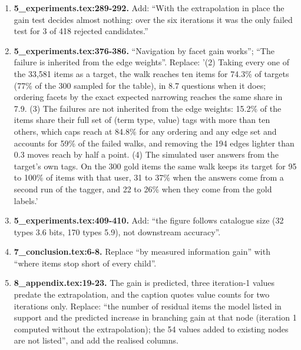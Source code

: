 \documentclass[10pt,a4paper]{article}
\begin{document}
{\begin{enumerate}[leftmargin=1.8em,itemsep=0.45em]
\item \textbf{5\_experiments.tex:289-292.} Add: ``With the extrapolation in place the gain test decides almost nothing: over the six iterations it was the only failed test for 3 of 418 rejected candidates.''
\item \textbf{5\_experiments.tex:376-386.} ``Navigation by facet gain works''; ``The failure is inherited from the edge weights''. Replace: '(2) Taking every one of the 33,581 items as a target, the walk reaches ten items for 74.3\% of targets (77\% of the 300 sampled for the table), in 8.7 questions when it does; ordering facets by the exact expected narrowing reaches the same share in 7.9. (3) The failures are not inherited from the edge weights: 15.2\% of the items share their full set of (term type, value) tags with more than ten others, which caps reach at 84.8\% for any ordering and any edge set and accounts for 59\% of the failed walks, and removing the 194 edges lighter than 0.3 moves reach by half a point. (4) The simulated user answers from the target's own tags. On the 300 gold items the same walk keeps its target for 95 to 100\% of items with that user, 31 to 37\% when the answers come from a second run of the tagger, and 22 to 26\% when they come from the gold labels.'
\item \textbf{5\_experiments.tex:409-410.} Add: ``the figure follows catalogue size (32 types 3.6 bits, 170 types 5.9), not downstream accuracy''.
\item \textbf{7\_conclusion.tex:6-8.} Replace ``by measured information gain'' with ``where items stop short of every child''.
\item \textbf{8\_appendix.tex:19-23.} The gain is predicted, three iteration-1 values predate the extrapolation, and the caption quotes value counts for two iterations only. Replace: ``the number of residual items the model listed in support and the predicted increase in branching gain at that node (iteration 1 computed without the extrapolation); the 54 values added to existing nodes are not listed'', and add the realised columns.
\end{enumerate}
}
\end{document}

